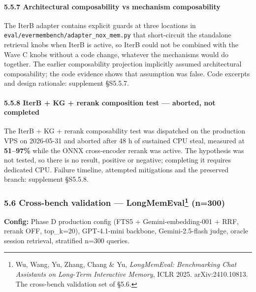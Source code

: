 \documentclass[
]{article}
\begin{document}
\paragraph{5.5.7 Architectural composability vs mechanism
composability}\label{architectural-composability-vs-mechanism-composability}

The IterB adapter contains explicit guards at three locations in
\texttt{eval/evermembench/adapter\_nox\_mem.py} that short-circuit the
standalone retrieval knobs when IterB is active, so IterB could not be
combined with the Wave C knobs without a code change, whatever the
mechanisms would do together. The earlier composability projection
implicitly assumed architectural composability; the code evidence shows
that assumption was false. Code excerpts and design rationale:
supplement §S5.5.7.

\paragraph{5.5.8 IterB + KG + rerank composition test --- aborted, not
completed}\label{iterb-kg-rerank-composition-test-aborted-not-completed}

The IterB + KG + rerank composability test was dispatched on the
production VPS on 2026-05-31 and aborted after 48 h of sustained CPU
steal, measured at \textbf{51--97\%} while the ONNX cross-encoder rerank
was active. The hypothesis was not tested, so there is no result,
positive or negative; completing it requires dedicated CPU. Failure
timeline, attempted mitigations and the preserved branch: supplement
§S5.5.8.

\subsubsection[5.6 Cross-bench validation --- LongMemEval
(n=300)]{\texorpdfstring{5.6 Cross-bench validation ---
LongMemEval\footnote{Wu, Wang, Yu, Zhang, Chang \& Yu,
  \emph{LongMemEval: Benchmarking Chat Assistants on Long-Term
  Interactive Memory}, ICLR 2025. arXiv:2410.10813. The cross-bench
  validation set of §5.6.}
(n=300)}{5.6 Cross-bench validation --- LongMemEval (n=300)}}\label{cross-bench-validation-longmemevallongmemeval-n300}

\textbf{Config:} Phase D production config (FTS5 + Gemini-embedding-001
+ RRF, rerank OFF, top\_k=20), GPT-4.1-mini backbone, Gemini-2.5-flash
judge, oracle session retrieval, stratified n=300 queries.
\end{document}

